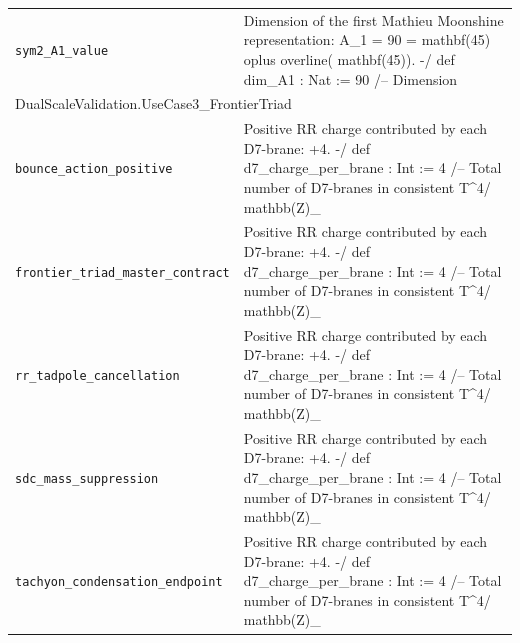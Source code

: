 \begin{longtable}{p{}p{}}
\quad\texttt{\footnotesize sym2\_A1\_value} & {\footnotesize Dimension of the first Mathieu Moonshine representation: A\_1 = 90 =  mathbf(45)  oplus  overline( mathbf(45)). -/ def dim\_A1 : Nat := 90 /-- Dimension} \\
\multicolumn{2}{l}{\textsf{\small DualScaleValidation.UseCase3\_FrontierTriad}} \\
\quad\texttt{\footnotesize bounce\_action\_positive} & {\footnotesize Positive RR charge contributed by each D7-brane: +4. -/ def d7\_charge\_per\_brane : Int := 4 /-- Total number of D7-branes in consistent T\^{}4/ mathbb(Z)\_} \\
\quad\texttt{\footnotesize frontier\_triad\_master\_contract} & {\footnotesize Positive RR charge contributed by each D7-brane: +4. -/ def d7\_charge\_per\_brane : Int := 4 /-- Total number of D7-branes in consistent T\^{}4/ mathbb(Z)\_} \\
\quad\texttt{\footnotesize rr\_tadpole\_cancellation} & {\footnotesize Positive RR charge contributed by each D7-brane: +4. -/ def d7\_charge\_per\_brane : Int := 4 /-- Total number of D7-branes in consistent T\^{}4/ mathbb(Z)\_} \\
\quad\texttt{\footnotesize sdc\_mass\_suppression} & {\footnotesize Positive RR charge contributed by each D7-brane: +4. -/ def d7\_charge\_per\_brane : Int := 4 /-- Total number of D7-branes in consistent T\^{}4/ mathbb(Z)\_} \\
\quad\texttt{\footnotesize tachyon\_condensation\_endpoint} & {\footnotesize Positive RR charge contributed by each D7-brane: +4. -/ def d7\_charge\_per\_brane : Int := 4 /-- Total number of D7-branes in consistent T\^{}4/ mathbb(Z)\_} \\
\end{longtable}

